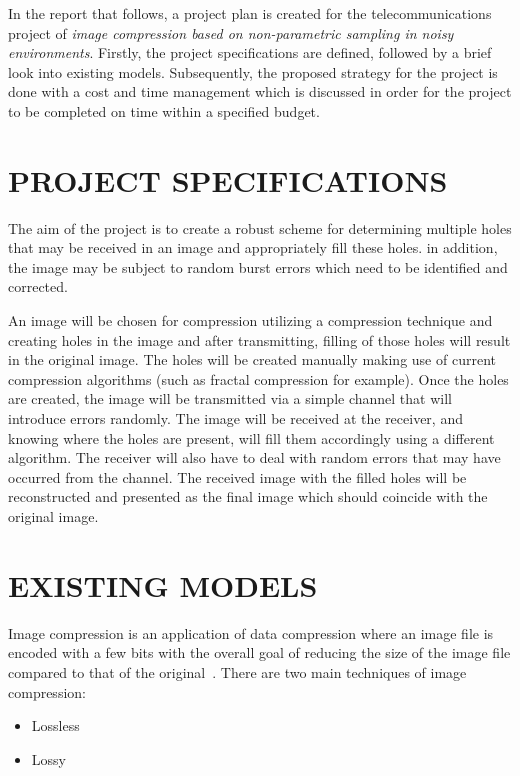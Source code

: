 \documentclass[10pt,twocolumn, a4paper]{witseiepaper}
\begin{document}
In the report that follows, a project plan is created for the telecommunications project of \emph{image compression based on non-parametric sampling in noisy environments}. Firstly, the project specifications are defined, followed by a brief look into existing models. Subsequently, the proposed strategy for the project is done with a cost and time management which is discussed in order for the project to be completed on time within a specified budget.

%
\section{PROJECT SPECIFICATIONS}
\label{sec: Project Specs}
The aim of the project is to create a robust scheme for determining multiple holes that may be received in an image and appropriately fill these holes. in addition, the image may be subject to random burst errors which need to be identified and corrected.

An image will be chosen for compression utilizing a compression technique and creating holes in the image and after transmitting, filling of those holes will result in the original image. The holes will be created manually making use of current compression algorithms (such as fractal compression for example). Once the holes are created, the image will be transmitted via a simple channel that will introduce errors randomly. The image will be received at the receiver, and knowing where the holes are present, will fill them accordingly using a different algorithm. The receiver will also have to deal with random errors that may have occurred from the channel. The received image with the filled holes will be reconstructed and presented as the final image which should coincide with the original image.

%
\section{EXISTING MODELS}
\label{sec: Existing Models}
Image compression is an application of data compression where an image file is encoded with a few bits with the overall goal of reducing the size of the image file compared to that of the original~\cite{ImageComp}. There are two main techniques of image compression:
\begin{itemize}
\item Lossless
\item Lossy
\end{itemize}
\end{document}
